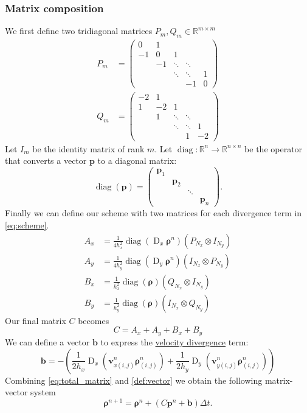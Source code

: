 \documentclass{article}
\DeclareMathOperator{\diag}{diag}
\DeclareMathOperator{\D}{D}
\renewcommand{\vec}[1]{\mathbf{#1}}
\newcommand{\gvec}[1]{\boldsymbol#1}
\begin{document}
\subsubsection{Matrix composition}
We first define two tridiagonal matrices $P_{m},Q_{m}\in \mathbb{R}^{m\times m}$
\begin{align*}
	P_{m} &= \begin{pmatrix}
		0 & 1 &  & &  \\
		-1 & 0 & 1 &   &  \\
		  & -1 & \ddots & \ddots &  \\
		  &  & \ddots & \ddots &1 \\
		 & &  & -1 & 0
	\end{pmatrix}\\
	Q_{m} &= \begin{pmatrix}
		-2 & 1 &  & &  \\
		1 & -2 & 1 &   &  \\
		  & 1 & \ddots & \ddots &  \\
		  &  & \ddots & \ddots &1 \\
		 & &  & 1 & -2
	\end{pmatrix}
\end{align*}
Let $I_m$ be the identity matrix of rank $m$. Let $\diag:\mathbb{R}^n\to\mathbb{R}^{n\times n}$ be the operator that converts a vector $\vec{p}$ to a diagonal matrix:
\begin{equation}
	\diag(\vec{p}) = \begin{pmatrix}
		\vec{p}_1\\
		&\vec{p}_2\\
		&&\ddots\\
		&&&\vec{p}_n
	\end{pmatrix}.
	\label{def:diag}
\end{equation}
Finally we can define our scheme with two matrices for each divergence term in \eqref{eq:scheme}.
\begin{align*}
	A_x &= \frac{1}{4h_x^2}\diag(\D_x\gvec{\rho}^n)(P_{N_x}\otimes I_{N_y})\\
	A_y &= \frac{1}{4h_y^2}\diag(\D_y\gvec{\rho}^n)(I_{N_x}\otimes P_{N_y})\\
	B_x &= \frac{1}{h_x^2}\diag(\gvec{\rho})(Q_{N_x}\otimes I_{N_y})\\
	B_y &= \frac{1}{h_y^2}\diag(\gvec{\rho})(I_{N_x}\otimes Q_{N_y})
\end{align*}
Our final matrix $C$ becomes 
\begin{equation}
	C = A_x + A_y + B_x + B_y 
	\label{eq:total_matrix}
\end{equation}
We can define a vector $\vec{b}$ to express the \underline{velocity divergence} term:
\begin{equation}
	\vec{b} = -\left( \frac{1}{2h_x}\D_x(\vec{v}^n_{x(i,j)}\gvec{\rho}^n_{(i,j)}) + \frac{1}{2h_y}\D_y(\vec{v}^n_{y(i,j)}\gvec{\rho}^n_{(i,j)})\right)
	\label{def:vector}
\end{equation}
Combining \eqref{eq:total_matrix} and \eqref{def:vector} we obtain the following matrix-vector system
\begin{equation}
	\gvec{\rho}^{n+1}=\gvec{\rho}^{n}+(C\vec{p}^n + \vec{b})\Delta t.
	\label{eq:matr_vec_scheme}
\end{equation}
\end{document}
